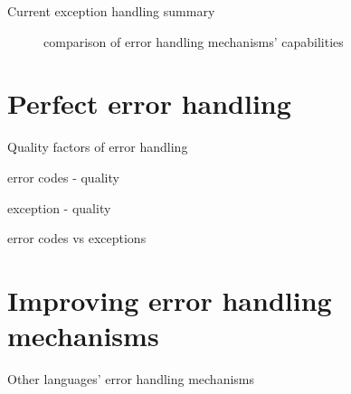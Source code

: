 \documentclass[10pt,a4paper]{beamer}
\begin{document}
\begin{frame}{Current exception handling summary}
	\centering

	\begin{figure}
	
		\caption{comparison of error handling mechanisms' capabilities}	
	\end{figure}
	

\end{frame}
	
\section{Perfect error handling}

\begin{frame}{Quality factors of error handling}
\end{frame}

\begin{frame}{error codes - quality}
\end{frame}

\begin{frame}{exception - quality}
\end{frame}

\begin{frame}{error codes vs exceptions}	
\end{frame}

\section{Improving error handling mechanisms}
	
\begin{frame}{Other languages' error handling mechanisms}
\end{frame}
\end{document}
